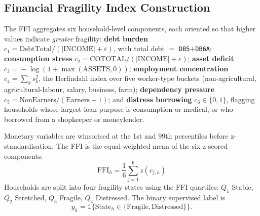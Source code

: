 \documentclass[colorlinks,balance]{asmeconf}
\begin{document}
\subsection{Financial Fragility Index Construction}
The FFI aggregates six household-level components, each oriented so that higher values indicate \emph{greater} fragility: \textbf{debt burden} $c_1 \!=\! \text{DebtTotal}/(|\text{INCOME}|\!+\!\varepsilon)$, with total debt $=$ \texttt{DB5}$+$\texttt{DB6A}; \textbf{consumption stress} $c_2 \!=\! \text{COTOTAL}/(|\text{INCOME}|\!+\!\varepsilon)$; \textbf{asset deficit} $c_3 \!=\! -\!\log(1\!+\!\max(\text{ASSETS},0))$; \textbf{employment concentration} $c_4 \!=\! \sum_k s_k^2$, the Herfindahl index over five worker-type buckets (non-agricultural, agricultural-labour, salary, business, farm); \textbf{dependency pressure} $c_5 \!=\! \text{NonEarners}/(\text{Earners}\!+\!1)$; and \textbf{distress borrowing} $c_6 \!\in\! \{0,1\}$, flagging households whose largest-loan purpose is consumption or medical, or who borrowed from a shopkeeper or moneylender.

Monetary variables are winsorised at the 1st and 99th percentiles before z-standardisation. The FFI is the equal-weighted mean of the six z-scored components:
\begin{equation}\label{eq:ffi}
\text{FFI}_h = \frac{1}{6}\sum_{j=1}^{6} z\!\left(c_{j,h}\right)
\end{equation}
Households are split into four fragility states using the FFI quartiles: $Q_1$ Stable, $Q_2$ Stretched, $Q_3$ Fragile, $Q_4$ Distressed. The binary supervised label is
\begin{equation}\label{eq:fragbinary}
y_h = \mathbb{1}\{\text{State}_h \in \{\text{Fragile}, \text{Distressed}\}\}.
\end{equation}
\end{document}
